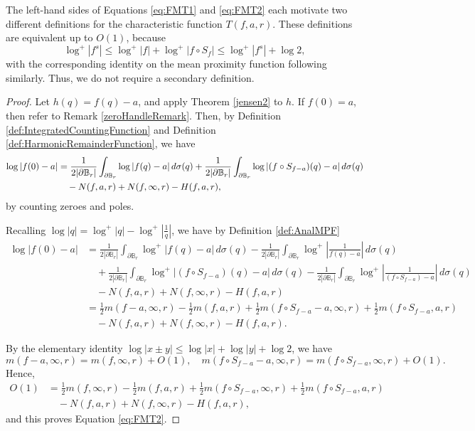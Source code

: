 \documentclass{amsart}
\begin{document}
\begin{remark}
    The left-hand sides of Equations \ref{eq:FMT1} and \ref{eq:FMT2} each motivate two different definitions for the characteristic function $T(f,a,r)$. These definitions are equivalent up to $O(1)$, because \[\log^+|f^s|\leq \log^+|f|+\log^+|f\circ S_f|\leq \log^+|f^s|+\log 2,\] with the corresponding identity on the mean proximity function following similarly. Thus, we do not require a secondary definition. 
\end{remark}

\begin{proof}
    Let $h(q)=f(q)-a$, and apply Theorem \ref{jensen2} to $h$. If $f(0)=a$, then refer to Remark \ref{zeroHandleRemark}. Then, by Definition \ref{def:IntegratedCountingFunction} and Definition \ref{def:HarmonicRemainderFunction}, we have \begin{align}\label{eq:FMT4}
        \log|f(0)-a|&=\frac{1}{2|\partial\mathbb B_r|}\int_{\partial\mathbb B_r}\log|f(q)-a|\,d\sigma(q) + \frac{1}{2|\partial\mathbb B_r|}\int_{\partial\mathbb B_r}\log|(f\circ S_{f-a})(q)-a|\,d\sigma(q)\\
        &\quad - N(f,a,r)+N(f,\infty,r) -H(f,a,r) \notag,
    \end{align}
    by counting zeroes and poles. 

    Recalling $\log|q|=\log^+|q|-\log^+\left|\frac{1}{q}\right|$, we have by Definition \ref{def:AnalMPF} \begin{align*}
        \log|f(0)-a|&=\frac{1}{2|\partial\mathbb B_r|}\int_{\partial\mathbb B_r}\log^+|f(q)-a|\,d\sigma(q)-\frac{1}{2|\partial\mathbb B_r|}\int_{\partial\mathbb B_r}\log^+\left|\frac{1}{f(q)-a}\right|\,d\sigma(q) \\
        &\quad+\frac{1}{2|\partial\mathbb B_r|}\int_{\partial\mathbb B_r}\log^+|(f\circ S_{f-a})(q)-a|\,d\sigma(q)-\frac{1}{2|\partial\mathbb B_r|}\int_{\partial\mathbb B_r}\log^+\left|\frac{1}{(f\circ S_{f-a})-a}\right|\,d\sigma(q) \\
        &\quad - N(f,a,r)+N(f,\infty,r) -H(f,a,r) \\
        &=\frac{1}{2}m(f-a,\infty,r)-\frac{1}{2}m(f,a,r)+\frac{1}{2}m(f\circ S_{f-a}-a,\infty,r)+\frac{1}{2}m(f\circ S_{f-a},a,r) \\
        &\quad - N(f,a,r)+N(f,\infty,r) -H(f,a,r) .\end{align*}

    By the elementary identity $\log|x\pm y|\leq \log|x|+\log|y|+\log 2$, we have \[m(f-a,\infty,r)=m(f,\infty,r)+O(1), \quad m(f\circ S_{f-a}-a,\infty,r)=m(f\circ S_{f-a},\infty,r)+O(1).\] Hence, \begin{align*}
        O(1)&= \frac{1}{2}m(f,\infty,r)-\frac{1}{2}m(f,a,r)+\frac{1}{2}m(f\circ S_{f-a},\infty,r)+\frac{1}{2}m(f\circ S_{f-a},a,r) \\
        &\quad- N(f,a,r)+N(f,\infty,r) -H(f,a,r), 
    \end{align*}
    and this proves Equation \ref{eq:FMT2}. 


\end{proof}
\end{document}
